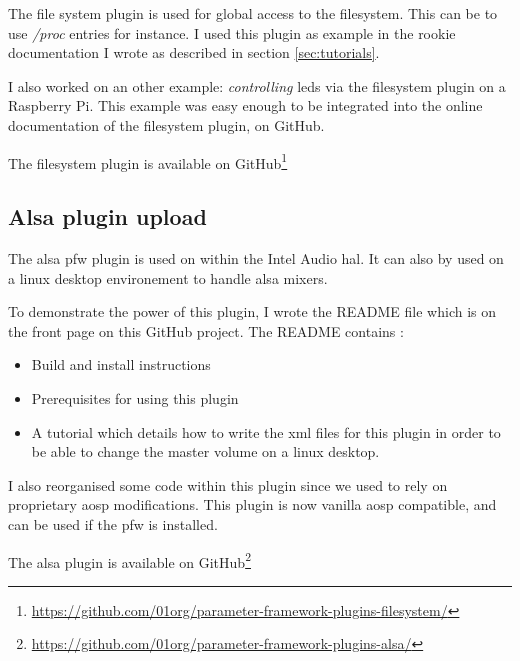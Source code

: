 The file system plugin is used for global access to the filesystem. This can be to
use \emph{/proc} entries for instance. I used this plugin as example in the rookie
documentation I wrote as described in section \ref{sec:tutorials}.

I also worked on an other example: \emph{controlling} leds via the filesystem
plugin on a Raspberry Pi.  This example was easy enough to be integrated into
the online documentation of the filesystem plugin, on \gls{GitHub}.

The filesystem plugin is available on \gls{GitHub}\footnote{\url{https://github.com/01org/parameter-framework-plugins-filesystem/}}

\subsection{Alsa plugin upload}

The \gls{alsa} \gls{pfw} plugin is used on within the Intel Audio \gls{hal}. It can also by used
on a linux desktop environement to handle \gls{alsa} mixers.

To demonstrate the power of this plugin, I wrote the README file which is on the
front page on this \gls{GitHub} project.  The README contains :
\begin{itemize}
    \item Build and install instructions
    \item Prerequisites for using this plugin
    \item A tutorial which details how to write the \gls{xml} files for this
    plugin in order to be able to change the master volume on a linux desktop.
\end{itemize}
I also reorganised some code within this plugin since we used to rely on proprietary \gls{aosp} modifications.
This plugin is now vanilla \gls{aosp} compatible, and can be used if the \gls{pfw} is installed.

The \gls{alsa} plugin is available on \gls{GitHub}\footnote{\url{https://github.com/01org/parameter-framework-plugins-alsa/}}
